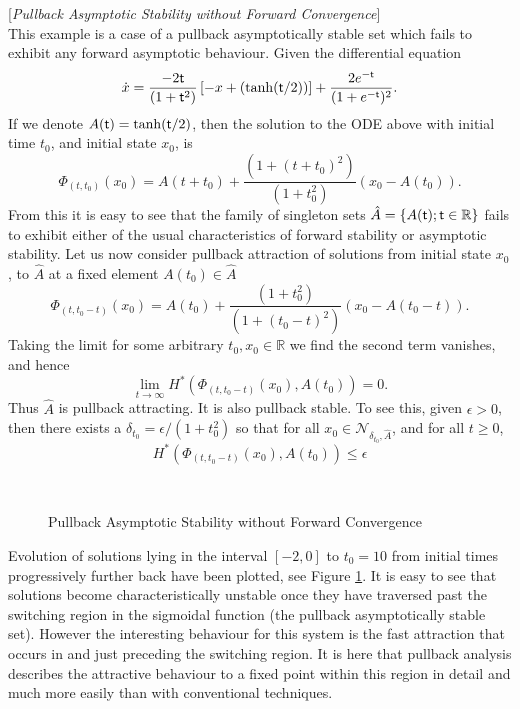 \begin{eg} \label{paseg} [\textit{Pullback Asymptotic Stability without
                   Forward Convergence}] \hfill \\
  This example is a case of a pullback asymptotically
  stable set which fails to exhibit any forward asymptotic
  behaviour. Given the differential equation
  \begin{equation}\label{de1eq}
  \dot{x} = \frac{-2 \mathsf{\mathsf{t}}}{(1+ \mathsf{\mathsf{t}}^2)} \left[ -x + \left( \tanh ( \mathsf{\mathsf{t}}/2)
         \right) \right] + \frac{2 e^{- \mathsf{\mathsf{t}}}} {(1 + e^{- \mathsf{\mathsf{t}}})^2}.
  \end{equation}
  If we denote $A( \mathsf{\mathsf{t}}) = \tanh ( \mathsf{\mathsf{t}}/2)$, then the solution to the ODE above with initial time $t_0$,
  and initial state $x_0$, is
  \[ \Phi_{(t,t_0)}(x_0) = A(t + t_0) + \frac{(1 + (t+t_0)^2)}{(1 +
                         t_0^2)}(x_0 - A(t_0)). \]
  From this it is easy to see that the family of singleton sets $\hat{A} =
  \{ A( \mathsf{\mathsf{t}}) ;  \mathsf{\mathsf{t}} \in \mathbb{R} \}$ fails to exhibit either of the usual
  characteristics of forward stability or asymptotic stability.
  Let us now   consider pullback attraction of solutions from initial state
  $x_0$, to   $\hat{A}$ at a fixed element $A(t_0) \in \hat{A}$
  \[ \Phi_{(t,t_0-t)}(x_0) = A(t_0) + \frac{(1 + t_0^2)}{(1 +
                         (t_0-t)^2)}(x_0 - A(t_0-t)). \]
  Taking the limit for some arbitrary $t_0, x_0 \in \mathbb{R}$ we find
  the second term vanishes, and hence
  \[ \lim_{t \to \infty} H^*(\Phi_{(t, t_0-t)}(x_0), A(t_0)) = 0. \]
  Thus $\hat{A}$ is pullback attracting. It is also pullback stable. To
  see this, given $\epsilon > 0$, then there exists a $\delta_{t_0} =
  \epsilon / (1 + t_0^2)$ so that for all $x_0 \in
  \mathcal{N}_{\delta_{t_0},\hat{A}}$, and for all $t \geq 0$,
  \[ H^*(\Phi_{(t, t_0-t)}(x_0), A(t_0)) \leq
                \epsilon \]

  \begin{figure}[htb]
  \begin{center}
  \leavevmode
  \hbox{
  \epsfxsize=9.5cm
    }%
  \protect\caption{Pullback Asymptotic Stability without Forward
                Convergence}
        \protect\label{pasegpic}
  \end{center}
  \end{figure}

  Evolution of solutions lying in the interval $[-2,0]$ to $t_0 = 10$ from
  initial times progressively further back have been plotted, see Figure
  \ref{pasegpic}. It is easy to see that solutions become
  characteristically unstable once they have traversed past the switching
  region in the sigmoidal function (the pullback asymptotically stable
  set). However the interesting behaviour for this system is the fast
  attraction that occurs in and just preceding the switching region. It is
  here that pullback analysis describes the attractive behaviour to a
  fixed point within this region in detail and much more easily than with
  conventional techniques.
\end{eg}



